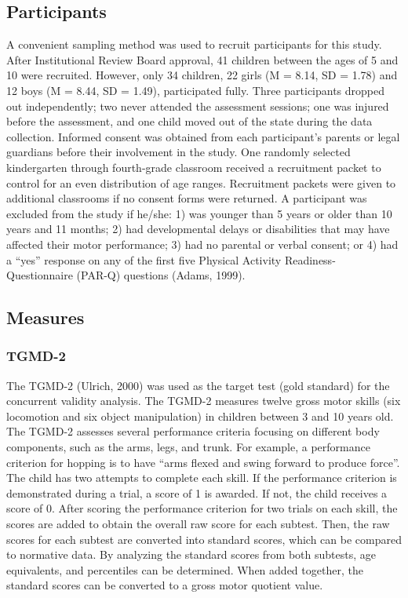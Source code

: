 \documentclass[
  man,
  colorlinks=true,linkcolor=blue,citecolor=blue,urlcolor=blue]{apa7}
\begin{document}
\hypertarget{participants}{%
\subsection{Participants}\label{participants}}

A convenient sampling method was used to recruit participants for this
study. After Institutional Review Board approval, 41 children between
the ages of 5 and 10 were recruited. However, only 34 children, 22 girls
(M = 8.14, SD = 1.78) and 12 boys (M = 8.44, SD = 1.49), participated
fully. Three participants dropped out independently; two never attended
the assessment sessions; one was injured before the assessment, and one
child moved out of the state during the data collection. Informed
consent was obtained from each participant's parents or legal guardians
before their involvement in the study. One randomly selected
kindergarten through fourth-grade classroom received a recruitment
packet to control for an even distribution of age ranges. Recruitment
packets were given to additional classrooms if no consent forms were
returned. A participant was excluded from the study if he/she: 1) was
younger than 5 years or older than 10 years and 11 months; 2) had
developmental delays or disabilities that may have affected their motor
performance; 3) had no parental or verbal consent; or 4) had a ``yes''
response on any of the first five Physical Activity
Readiness-Questionnaire (PAR-Q) questions (Adams, 1999).

\hypertarget{measures}{%
\subsection{Measures}\label{measures}}

\hypertarget{tgmd-2}{%
\subsubsection{TGMD-2}\label{tgmd-2}}

The TGMD-2 (Ulrich, 2000) was used as the target test (gold standard)
for the concurrent validity analysis. The TGMD-2 measures twelve gross
motor skills (six locomotion and six object manipulation) in children
between 3 and 10 years old. The TGMD-2 assesses several performance
criteria focusing on different body components, such as the arms, legs,
and trunk. For example, a performance criterion for hopping is to have
``arms flexed and swing forward to produce force''. The child has two
attempts to complete each skill. If the performance criterion is
demonstrated during a trial, a score of 1 is awarded. If not, the child
receives a score of 0. After scoring the performance criterion for two
trials on each skill, the scores are added to obtain the overall raw
score for each subtest. Then, the raw scores for each subtest are
converted into standard scores, which can be compared to normative data.
By analyzing the standard scores from both subtests, age equivalents,
and percentiles can be determined. When added together, the standard
scores can be converted to a gross motor quotient value.
\end{document}
